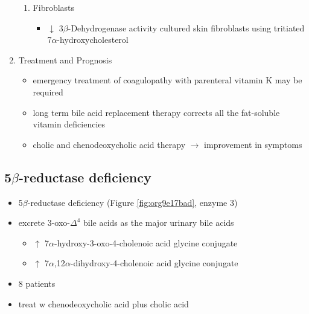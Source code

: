 \documentclass{scrartcl}
\begin{document}
\begin{enumerate}
\begin{enumerate}
\item Fibroblasts
\label{sec:org7571fbb}
\begin{itemize}
\item \(\downarrow\) 3\(\beta\)-Dehydrogenase activity cultured skin fibroblasts using
tritiated 7\(\alpha\)-hydroxycholesterol
\end{itemize}
\end{enumerate}

\item Treatment and Prognosis
\label{sec:orge56f996}
\begin{itemize}
\item emergency treatment of coagulopathy with parenteral vitamin K may be required
\item long term bile acid replacement therapy corrects all the fat-soluble
vitamin deficiencies

\item cholic and chenodeoxycholic acid therapy \(\to\) improvement in symptoms
\end{itemize}
\end{enumerate}

\subsection{5\(\beta\)-reductase deficiency}
\label{sec:org2e02665}
\begin{itemize}
\item 5\(\beta\)-reductase deficiency (Figure \ref{fig:org9e17bad}, enzyme 3)
\item excrete 3-oxo-\(\Delta^{\text{4}}\) bile acids as the major urinary bile acids
\begin{itemize}
\item \(\uparrow\) 7\(\alpha\)-hydroxy-3-oxo-4-cholenoic acid glycine conjugate
\item \(\uparrow\) 7\(\alpha\),12\(\alpha\)-dihydroxy-4-cholenoic acid glycine conjugate
\end{itemize}
\item 8 patients
\item treat w chenodeoxycholic acid plus cholic acid
\end{itemize}
\end{document}
